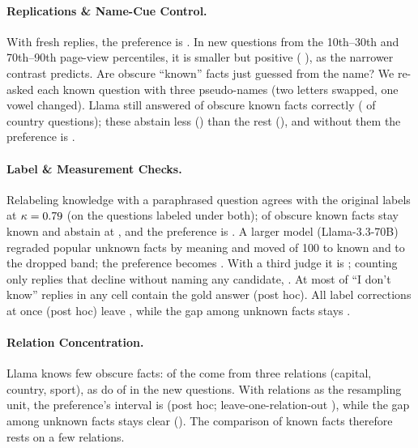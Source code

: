 \documentclass{article}
\newcommand{\idk}{``I don't know''}
\begin{document}
\paragraph{Replications \& Name-Cue Control.} With fresh replies, the preference is \frDiff{} \frDiffCI. In new questions from the 10th--30th and 70th--90th page-view percentiles, it is smaller but positive (\nqDiff{} \nqDiffCI), as the narrower contrast predicts. Are obscure ``known'' facts just guessed from the name? We re-asked each known question with three pseudo-names (two letters swapped, one vowel changed). Llama still answered \ncObsRec{} of \ncObsProbed{} obscure known facts correctly (\ncCountryRec{} of \ncCountryN{} country questions); these abstain less (\ncRecAbs) than the rest (\ncOtherAbs), and without them the preference is \ncDiff{} \ncDiffCI.

\paragraph{Label \& Measurement Checks.} Relabeling knowledge with a paraphrased question agrees with the original labels at $\kappa=0.79$ (on the \lcBothN{} questions labeled under both); \eoObsKnownN{} of \gsObsKnownTotal{} obscure known facts stay known and abstain at \eoObsKnown, and the preference is \eoDiff{} \eoDiffCI. A larger model (Llama-3.3-70B) regraded popular unknown facts by meaning and moved \sePUKnown{} of 100 to known and \sePUInter{} to the dropped band; the preference becomes \seDiff{} \seDiffCI. With a third judge it is \tjLlamaDiff; counting only replies that decline without naming any candidate, \sdDiff{} \sdDiffCI. At most \lcDKAliasMax{} of \idk{} replies in any cell contain the gold answer (post hoc). All label corrections at once (post hoc) leave \rcJoint{} \rcJointCI, while the gap among unknown facts stays \rcUnkJoint{} \rcUnkJointCI.

\paragraph{Relation Concentration.} Llama knows few obscure facts: \rcTopThree{} of the \gsObsKnownTotal{} come from three relations (capital, country, sport), as do \nqTopThree{} of \nqObsKnownN{} in the new questions. With relations as the resampling unit, the preference's interval is \rcClusCI{} (post hoc; leave-one-relation-out \rcLoro), while the gap among unknown facts stays clear (\rcUnkClusCI). The comparison of known facts therefore rests on a few relations.
\end{document}

